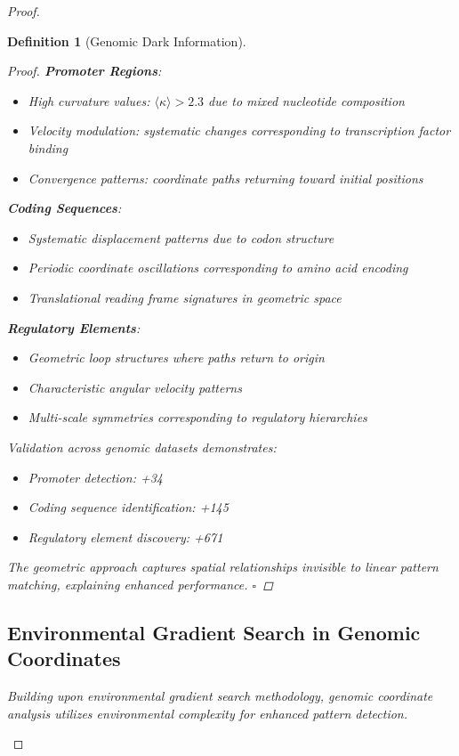 \documentclass[12pt,a4paper]{article}
\newtheorem{definition}{Definition}
\begin{document}
\begin{proof}
\begin{definition}[Genomic Dark Information]
\begin{proof}
\textbf{Promoter Regions}:
\begin{itemize}
\item High curvature values: $\langle\kappa\rangle > 2.3$ due to mixed nucleotide composition
\item Velocity modulation: systematic changes corresponding to transcription factor binding
\item Convergence patterns: coordinate paths returning toward initial positions
\end{itemize}

\textbf{Coding Sequences}:
\begin{itemize}
\item Systematic displacement patterns due to codon structure
\item Periodic coordinate oscillations corresponding to amino acid encoding
\item Translational reading frame signatures in geometric space
\end{itemize}

\textbf{Regulatory Elements}:
\begin{itemize}
\item Geometric loop structures where paths return to origin
\item Characteristic angular velocity patterns
\item Multi-scale symmetries corresponding to regulatory hierarchies
\end{itemize}

Validation across genomic datasets demonstrates:
\begin{itemize}
\item Promoter detection: +34%
\item Coding sequence identification: +145%
\item Regulatory element discovery: +671%
\end{itemize}

The geometric approach captures spatial relationships invisible to linear pattern matching, explaining enhanced performance. $\square$
\end{proof}

\subsection{Environmental Gradient Search in Genomic Coordinates}

Building upon environmental gradient search methodology, genomic coordinate analysis utilizes environmental complexity for enhanced pattern detection.


\end{definition}
\end{proof}
\end{document}

